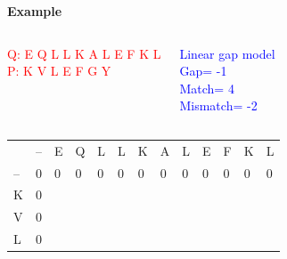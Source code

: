\documentclass{bredelebeamer}
\begin{document}
 \begin{frame}
 \centering
  \begin{Large}
   \textbf{Example} \linebreak
  \end{Large}
\begin{columns}
\textcolor{red}{Q:  E Q L L K A L E F K L \\
P:  K V L E F G Y}

\textcolor{blue}{Linear gap model \\
Gap= -1 \\
Match= 4 \\
Mismatch= -2}

\end{columns}
     
     \begin{table}[]
\centering
\begin{tabular}{lllllllllllll}
                        & --                     & E                      & Q                      & L                      & L                      & K                      & A                      & L                      & E                      & F                      & K                      & L                      \\ \cline{2-13} 
\multicolumn{1}{l|}{--} & \multicolumn{1}{l|}{0} & \multicolumn{1}{l|}{0} & \multicolumn{1}{l|}{0} & \multicolumn{1}{l|}{0} & \multicolumn{1}{l|}{0} & \multicolumn{1}{l|}{0} & \multicolumn{1}{l|}{0} & \multicolumn{1}{l|}{0} & \multicolumn{1}{l|}{0} & \multicolumn{1}{l|}{0} & \multicolumn{1}{l|}{0} & \multicolumn{1}{l|}{0} \\ \cline{2-13} 
\multicolumn{1}{l|}{K}  & \multicolumn{1}{l|}{0} & \multicolumn{1}{l|}{}  & \multicolumn{1}{l|}{}  & \multicolumn{1}{l|}{}  & \multicolumn{1}{l|}{}  & \multicolumn{1}{l|}{}  & \multicolumn{1}{l|}{}  & \multicolumn{1}{l|}{}  & \multicolumn{1}{l|}{}  & \multicolumn{1}{l|}{}  & \multicolumn{1}{l|}{}  & \multicolumn{1}{l|}{}  \\ \cline{2-13} 
\multicolumn{1}{l|}{V}  & \multicolumn{1}{l|}{0} & \multicolumn{1}{l|}{}  & \multicolumn{1}{l|}{}  & \multicolumn{1}{l|}{}  & \multicolumn{1}{l|}{}  & \multicolumn{1}{l|}{}  & \multicolumn{1}{l|}{}  & \multicolumn{1}{l|}{}  & \multicolumn{1}{l|}{}  & \multicolumn{1}{l|}{}  & \multicolumn{1}{l|}{}  & \multicolumn{1}{l|}{}  \\ \cline{2-13} 
\multicolumn{1}{l|}{L}  & \multicolumn{1}{l|}{0} & \multicolumn{1}{l|}{}  & \multicolumn{1}{l|}{}  & \multicolumn{1}{l|}{}  & \multicolumn{1}{l|}{}  & \multicolumn{1}{l|}{}  & \multicolumn{1}{l|}{}  & \multicolumn{1}{l|}{}  & \multicolumn{1}{l|}{}  & \multicolumn{1}{l|}{}  & \multicolumn{1}{l|}{}  & \multicolumn{1}{l|}{}  \\ \cline{2-13} 

\end{tabular}
\end{table}
\end{frame}
\end{document}
